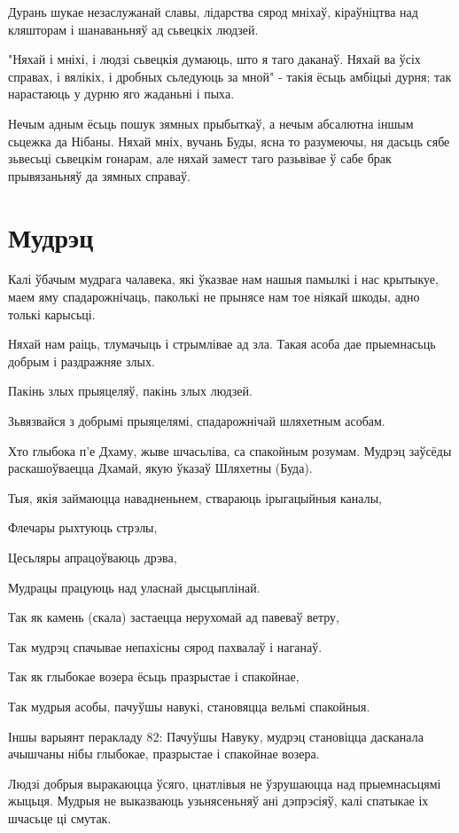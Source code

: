 \documentclass{article}
\begin{document}
Дурань шукае незаслужанай славы, лідарства сярод мніхаў, кіраўніцтва
над кляшторам і шанаваньняў ад сьвецкіх людзей.

"Няхай і мніхі, і людзі сьвецкія думаюць, што я таго даканаў. Няхай
ва ўсіх справах, і вялікіх, і дробных сьледуюць за мной" - такія ёсьць
амбіцыі дурня; так нарастаюць у дурню яго жаданьні і пыха.

Нечым адным ёсьць пошук зямных прыбыткаў, а нечым абсалютна іншым
сьцежка да Нібаны. Няхай мніх, вучань Буды, ясна то разумеючы, ня дасьць
сябе зьвесьці сьвецкім гонарам, але няхай замест таго разьвівае ў сабе
брак прывязаньняў да зямных справаў.

\section{Мудрэц}

Калі ўбачым мудрага чалавека, які ўказвае нам нашыя памылкі і нас
крытыкуе, маем яму спадарожнічаць, паколькі не прынясе нам тое ніякай
шкоды, адно толькі карысьці.

Няхай нам раіць, тлумачыць і стрымлівае ад зла. Такая асоба дае
прыемнасьць добрым і раздражняе злых.

Пакінь злых прыяцеляў, пакінь злых людзей.

Зьвязвайся з добрымі прыяцелямі, спадарожнічай шляхетным асобам.

Хто глыбока п'е Дхаму, жыве шчасьліва, са спакойным розумам. Мудрэц
заўсёды раскашоўваецца Дхамай, якую ўказаў Шляхетны (Буда).

Тыя, якія займаюцца навадненьнем, ствараюць ірыгацыйныя каналы,

Флечары рыхтуюць стрэлы,

Цесьляры апрацоўваюць дрэва,

Мудрацы працуюць над уласнай дысцыплінай.

Так як камень (скала) застаецца нерухомай ад павеваў ветру,

Так мудрэц спачывае непахісны сярод пахвалаў і наганаў.

Так як глыбокае возера ёсьць празрыстае і спакойнае,

Так мудрыя асобы, пачуўшы навукі, становяцца вельмі спакойныя.

Іншы варыянт перакладу 82: Пачуўшы Навуку, мудрэц становіцца дасканала
ачышчаны нібы глыбокае, празрыстае і спакойнае возера.

Людзі добрыя выракаюцца ўсяго, цнатлівыя не ўзрушаюцца над
прыемнасьцямі жыцьця. Мудрыя не выказваюць узьнясеньняў ані дэпрэсіяў,
калі спатыкае іх шчасьце ці смутак.
\end{document}
